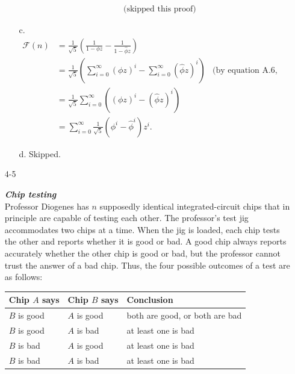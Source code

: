 \documentclass{report}
\makeatletter
\renewenvironment{framed}{%
 \def\FrameCommand##1{\hskip\@totalleftmargin
 \fboxsep=\FrameSep\fbox{##1}}%
 \MakeFramed {\advance\hsize-\width
   \@totalleftmargin\z@ \linewidth\hsize
   \@setminipage}}%
 {\par\unskip\endMakeFramed}
\makeatother
\begin{document}
\begin{enumerate}
\begin{framed}
\begin{enumerate}
\begin{equation*}
\begin{aligned}
                         & \text{(skipped this proof)}
        \end{aligned}
      \end{equation*}
    \item[c.]
      \begin{equation*}
        \begin{aligned}
          \mathcal{F}(n) &= \frac{1}{\sqrt 5} \left(\frac{1}{1 - \phi z} - \frac{1}{1 - \hat\phi z}\right)\\
                         &= \frac{1}{\sqrt 5} \left(\sum_{i = 0}^{\infty} (\phi z)^i - \sum_{i = 0}^{\infty} (\hat\phi z)^i\right)
                         & \text{(by equation A.6, geometric series)}\\
                         &= \frac{1}{\sqrt 5} \sum_{i = 0}^{\infty} \left( (\phi z)^i - (\hat\phi z)^i \right)\\
                         &= \sum_{i = 0}^{\infty} \frac{1}{\sqrt 5} (\phi^i - \hat\phi^i) z^i.
        \end{aligned}
      \end{equation*}
    \item[d.] Skipped.
  \end{enumerate}
\end{framed}

\newpage

\item[4{-}5]{\textbf{\emph{Chip testing}}\\
Professor Diogenes has $n$ supposedly identical integrated-circuit chips that in
principle are capable of testing each other. The professor's test jig
accommodates two chips at a time. When the jig is loaded, each chip tests the
other and reports whether it is good or bad. A good chip always reports
accurately whether the other chip is good or bad, but the professor cannot trust
the answer of a bad chip. Thus, the four possible outcomes of a test are as
follows:

\begin{tabular}{lll}
  Chip $A$ says & Chip $B$ says & Conclusion\\
  \toprule
  $B$ is good & $A$ is good & both are good, or both are bad\\
  $B$ is good & $A$ is bad  & at least one is bad\\
  $B$ is bad  & $A$ is good & at least one is bad\\
  $B$ is bad  & $A$ is bad  & at least one is bad
\end{tabular}

}
\end{enumerate}
\end{document}
